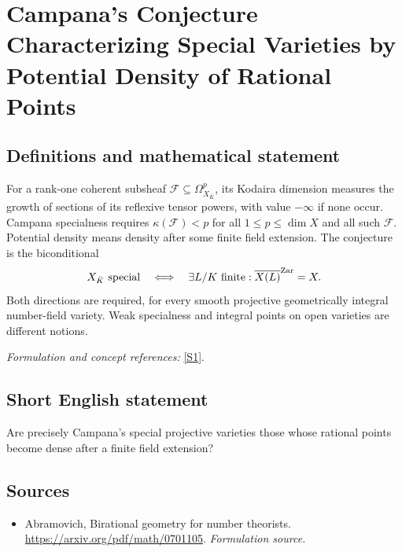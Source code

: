 \documentclass[11pt]{article}
\begin{document}
\section*{\texorpdfstring{Campana's Conjecture Characterizing Special Varieties by Potential Density of Rational Points}{Campana's Conjecture Characterizing Special Varieties by Potential Density of Rational Points}}\label{30006719}
\subsection{Definitions and mathematical statement}
For a rank-one coherent subsheaf $\mathcal F\subseteq\Omega^p_{X_{\bar K}}$, its Kodaira dimension measures the growth of sections of its reflexive tensor powers, with value $-\infty$ if none occur. Campana specialness requires $\kappa(\mathcal F)<p$ for all $1\le p\le\dim X$ and all such $\mathcal F$. Potential density means density after some finite field extension. The conjecture is the biconditional
\[
 X_{\bar K}\text{ special}\quad\Longleftrightarrow\quad
 \exists L/K\text{ finite}:\overline{X(L)}^{\rm Zar}=X.
\]
Both directions are required, for every smooth projective geometrically integral number-field variety. Weak specialness and integral points on open varieties are different notions.
\par\smallskip\textit{Formulation and concept references:} \href{https://arxiv.org/pdf/math/0701105}{[S1]}.

\subsection{Short English statement}
Are precisely Campana's special projective varieties those whose rational points become dense after a finite field extension?
\subsection{Sources}
\begin{itemize}
\item[S1]Abramovich, Birational geometry for number theorists.
\url{https://arxiv.org/pdf/math/0701105}.
\textit{Formulation source.}
\end{itemize}
\end{document}

